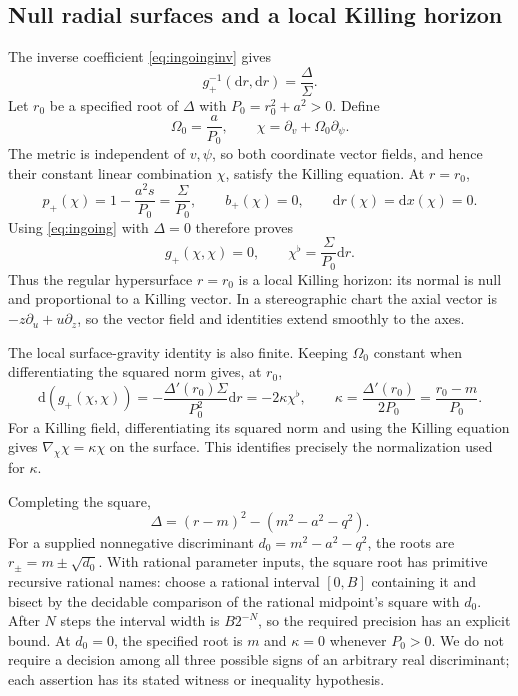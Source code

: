 \documentclass[11pt,a4paper]{article}
\numberwithin{equation}{section}
\theoremstyle{definition}\newtheorem{definition}[theorem]{Definition}
\theoremstyle{remark}\newtheorem{remark}[theorem]{Remark}
\newcommand{\dd}{\mathrm{d}}
\begin{document}
\subsection{Null radial surfaces and a local Killing horizon}
The inverse coefficient \eqref{eq:ingoinginv} gives
\begin{equation}\label{eq:nullr}
 g_+^{-1}(\dd r,\dd r)=\frac\Delta\Sigma.
\end{equation}
Let $r_0$ be a specified root of $\Delta$ with $P_0=r_0^2+a^2>0$. Define
\begin{equation}\label{eq:chi}
 \Omega_0=\frac a{P_0},\qquad \chi=\partial_v+\Omega_0\partial_\psi.
\end{equation}
The metric is independent of $v,\psi$, so both coordinate vector fields, and hence their constant linear combination $\chi$, satisfy the Killing equation. At $r=r_0$,
\[
 p_+(\chi)=1-\frac{a^2s}{P_0}=\frac\Sigma{P_0},
 \qquad b_+(\chi)=0,\qquad \dd r(\chi)=\dd x(\chi)=0.
\]
Using \eqref{eq:ingoing} with $\Delta=0$ therefore proves
\begin{equation}\label{eq:horizonkilling}
 g_+(\chi,\chi)=0,\qquad \chi^\flat=\frac\Sigma{P_0}\dd r.
\end{equation}
Thus the regular hypersurface $r=r_0$ is a local Killing horizon: its normal is null and proportional to a Killing vector. In a stereographic chart the axial vector is $-z\partial_u+u\partial_z$, so the vector field and identities extend smoothly to the axes.

The local surface-gravity identity is also finite. Keeping $\Omega_0$ constant when differentiating the squared norm gives, at $r_0$,
\[
 \dd(g_+(\chi,\chi))=-\frac{\Delta'(r_0)\Sigma}{P_0^2}\dd r
                   =-2\kappa\chi^\flat,
 \qquad \kappa=\frac{\Delta'(r_0)}{2P_0}=\frac{r_0-m}{P_0}.
\]
For a Killing field, differentiating its squared norm and using the Killing equation gives $\nabla_\chi\chi=\kappa\chi$ on the surface. This identifies precisely the normalization used for $\kappa$.

Completing the square,
\begin{equation}\label{eq:roots}
 \Delta=(r-m)^2-(m^2-a^2-q^2).
\end{equation}
For a supplied nonnegative discriminant $d_0=m^2-a^2-q^2$, the roots are $r_\pm=m\pm\sqrt{d_0}$. With rational parameter inputs, the square root has primitive recursive rational names: choose a rational interval $[0,B]$ containing it and bisect by the decidable comparison of the rational midpoint's square with $d_0$. After $N$ steps the interval width is $B2^{-N}$, so the required precision has an explicit bound. At $d_0=0$, the specified root is $m$ and $\kappa=0$ whenever $P_0>0$. We do not require a decision among all three possible signs of an arbitrary real discriminant; each assertion has its stated witness or inequality hypothesis.
\end{document}
